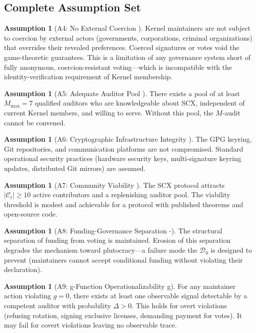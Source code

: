 \documentclass[12pt,a4paper]{article}
\theoremstyle{definition}
\newtheorem{assumption}[theorem]{Assumption}
\newcommand{\Contributors}{\mathcal{C}}
\newcommand{\gzero}{g=0}
\newcommand{\GzeroDecl}{\mathcal{D}_{0}}
\begin{document}
\subsection{Complete Assumption Set}
\begin{assumption}[A4: No External Coercion ]
\label{ass:A4}
Kernel maintainers are not subject to coercion by external actors (governments, corporations, criminal organizations) that overrides their revealed preferences. Coerced signatures or votes void the game-theoretic guarantees. This is a limitation of any governance system short of fully anonymous, coercion-resistant voting---which is incompatible with the identity-verification requirement of Kernel membership.
\end{assumption}
\begin{assumption}[A5: Adequate Auditor Pool ]
\label{ass:A5}
There exists a pool of at least $M_{\max} = 7$ qualified auditors who are knowledgeable about SCX, independent of current Kernel members, and willing to serve. Without this pool, the $M$-audit cannot be convened.
\end{assumption}
\begin{assumption}[A6: Cryptographic Infrastructure Integrity ]
\label{ass:A6}
The GPG keyring, Git repositories, and communication platforms are not compromised. Standard operational security practices (hardware security keys, multi-signature keyring updates, distributed Git mirrors) are assumed.
\end{assumption}
\begin{assumption}[A7: Community Viability ]
\label{ass:A7}
The SCX protocol attracts $|\Contributors_t| \geq 10$ active contributors and a replenishing auditor pool. The viability threshold is modest and achievable for a protocol with published theorems and open-source code.
\end{assumption}
\begin{assumption}[A8: Funding-Governance Separation -]
\label{ass:A8}
The structural separation of funding from voting is maintained. Erosion of this separation degrades the mechanism toward plutocracy---a failure mode the $\GzeroDecl$ is designed to prevent (maintainers cannot accept conditional funding without violating their declaration).
\end{assumption}
\begin{assumption}[A9: g-Function Operationalizability g]
\label{ass:A9}
For any maintainer action violating $\gzero$, there exists at least one observable signal detectable by a competent auditor with probability $\Delta > 0$. This holds for overt violations (refusing rotation, signing exclusive licenses, demanding payment for votes). It may fail for covert violations leaving no observable trace.
\end{assumption}
\end{document}
